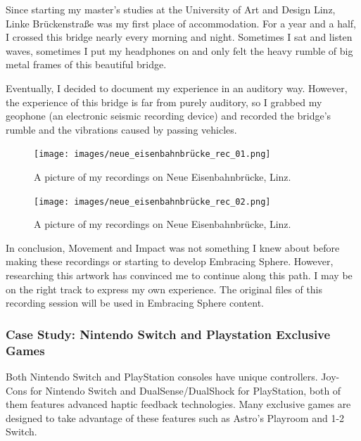                 Since starting my master's studies at the University of Art and Design Linz, Linke Brückenstraße was my first place of accommodation. For a year and a half, I crossed this bridge nearly every morning and night. Sometimes I sat and listen waves, sometimes I put my headphones on and only felt the heavy rumble of big metal frames of this beautiful bridge.\par

                Eventually, I decided to document my experience in an auditory way. However, the experience of this bridge is far from purely auditory, so I grabbed my geophone (an electronic seismic recording device) and recorded the bridge’s rumble and the vibrations caused by passing vehicles.\par

                \begin{figure}[H]
                    \centering
                    \texttt{[image: images/neue\_eisenbahnbrücke\_rec\_01.png]}
                    \caption{A picture of my recordings on Neue Eisenbahnbrücke, Linz.}
                    \label{fig:BRUCKELINZREC_01}
                \end{figure}

                \begin{figure}[H]
                    \centering
                    \texttt{[image: images/neue\_eisenbahnbrücke\_rec\_02.png]}
                    \caption{A picture of my recordings on Neue Eisenbahnbrücke, Linz.}
                    \label{fig:BRUCKELINZREC_02}
                \end{figure}

                In conclusion, Movement and Impact was not something I knew about before making these recordings or starting to develop Embracing Sphere. However, researching this artwork has convinced me to continue along this path. I may be on the right track to express my own experience. The original files of this recording session will be used in Embracing Sphere content.\par
            \subsubsection{Case Study: Nintendo Switch and Playstation Exclusive Games}
                Both Nintendo Switch and PlayStation consoles have unique controllers. Joy-Cons for Nintendo Switch and DualSense/DualShock for PlayStation, both of them features advanced haptic feedback technologies. Many exclusive games are designed to take advantage of these features such as Astro's Playroom and 1-2 Switch.\par

